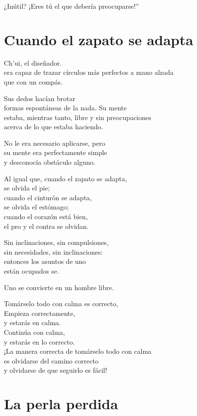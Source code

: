 \documentclass[hidelinks]{memoir}
\begin{document}
	¿Inútil? ¡Eres tú el que debería preocuparse!''
	
	\chapter*{Cuando el zapato se adapta}
	
	Ch'ui, el diseñador.\\
	era capaz de trazar círculos más perfectos a mano alzada\\
	que con un compás.
	
	Sus dedos hacían brotar\\
	formas espontáneas de la nada. Su mente\\
	estaba, mientras tanto, libre y sin preocupaciones\\
	acerca de lo que estaba haciendo.
	
	No le era necesario aplicarse, pero\\
	su mente era perfectamente simple\\
	y desconocía obstáculo alguno.
	
	Al igual que, cuando el zapato se adapta,\\
	se olvida el pie;\\
	cuando el cinturón se adapta,\\
	se olvida el estómago;\\
	cuando el corazón está bien,\\
	el pro y el contra se olvidan.
	
	Sin inclinaciones, sin compulsiones,\\
	sin necesidades, sin inclinaciones:\\
	entonces los asuntos de uno\\
	están ocupados se.
	
	Uno se convierte en un hombre libre.
	
	Tomárselo todo con calma es correcto,\\
	Empieza correctamente,\\
	y estarás en calma.\\
	Continúa con calma,\\
	y estarás en lo correcto.\\
	¡La manera correcta de tomárselo todo con calma\\
	es olvidarse del camino correcto\\
	y olvidarse de que seguirlo es fácil!
	
	\chapter*{La perla perdida}
	
\end{document}
